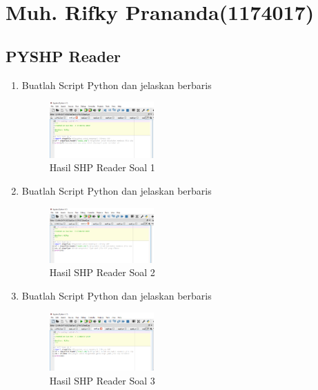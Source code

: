 \section{Muh. Rifky Prananda(1174017)}
\subsection{PYSHP Reader}
\begin{enumerate}
    \item Buatlah Script Python dan jelaskan berbaris
    
    \hfill\break
    \begin{figure}[H]
		\includegraphics[width=4cm]{figures/1174017/3/soal1.PNG}
		\centering
		\caption{Hasil SHP Reader Soal 1}
    \end{figure}
    
    \item Buatlah Script Python dan jelaskan berbaris
    
    \hfill\break
    \begin{figure}[H]
		\includegraphics[width=4cm]{figures/1174017/3/soal2.PNG}
		\centering
		\caption{Hasil SHP Reader Soal 2}
    \end{figure}
    
    \item Buatlah Script Python dan jelaskan berbaris
    
    \hfill\break
    \begin{figure}[H]
		\includegraphics[width=4cm]{figures/1174017/3/soal3.PNG}
		\centering
		\caption{Hasil SHP Reader Soal 3}
    \end{figure}
    

\end{enumerate}
